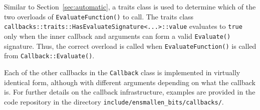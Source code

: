 Similar to Section~\ref{sec:automatic}, a traits class is used to determine
which of the two overloads of {\tt EvaluateFunction()} to call.  The traits
class {\tt callbacks::traits::HasEvaluateSignature<...>::value}
evaluates to {\tt true} only when the inner callback and arguments can form a
valid {\tt Evaluate()} signature.  Thus, the correct overload is called when
{\tt EvaluateFunction()} is called from {\tt Callback::Evaluate()}.

Each of the other callbacks in the {\tt Callback} class is implemented in
virtually identical form, although with different arguments depending on what
the callback is.  For further details on the callback infrastructure,
examples are provided in the code repository in the directory
{\tt include/ensmallen\_bits/callbacks/}.














